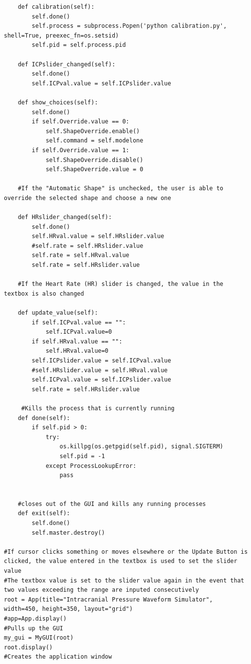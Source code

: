 \documentclass[12pt]{report}
\begin{document}
\begin{lstlisting}
    def calibration(self):
        self.done()
        self.process = subprocess.Popen('python calibration.py', shell=True, preexec_fn=os.setsid)
        self.pid = self.process.pid

    def ICPslider_changed(self):
        self.done()
        self.ICPval.value = self.ICPslider.value

    def show_choices(self):
        self.done()
        if self.Override.value == 0:
            self.ShapeOverride.enable()
            self.command = self.modelone
        if self.Override.value == 1:
            self.ShapeOverride.disable()
            self.ShapeOverride.value = 0

    #If the "Automatic Shape" is unchecked, the user is able to override the selected shape and choose a new one

    def HRslider_changed(self):
        self.done()
        self.HRval.value = self.HRslider.value
        #self.rate = self.HRslider.value
        self.rate = self.HRval.value
        self.rate = self.HRslider.value

    #If the Heart Rate (HR) slider is changed, the value in the textbox is also changed

    def update_value(self):
        if self.ICPval.value == "":
            self.ICPval.value=0
        if self.HRval.value == "":
            self.HRval.value=0
        self.ICPslider.value = self.ICPval.value
        #self.HRslider.value = self.HRval.value
        self.ICPval.value = self.ICPslider.value
        self.rate = self.HRslider.value

     #Kills the process that is currently running
    def done(self):
        if self.pid > 0:
            try:
                os.killpg(os.getpgid(self.pid), signal.SIGTERM)
                self.pid = -1
            except ProcessLookupError:
                pass


    #closes out of the GUI and kills any running processes    
    def exit(self):
        self.done()
        self.master.destroy()

#If cursor clicks something or moves elsewhere or the Update Button is clicked, the value entered in the textbox is used to set the slider value
#The textbox value is set to the slider value again in the event that two values exceeding the range are inputed consecutively 
root = App(title="Intracranial Pressure Waveform Simulator", width=450, height=350, layout="grid")
#app=App.display()
#Pulls up the GUI
my_gui = MyGUI(root)
root.display()
#Creates the application window
\end{lstlisting}
\end{document}
